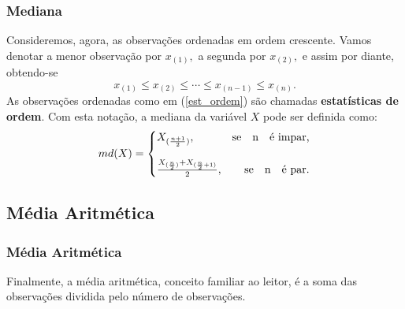 \documentclass[14pt,aspectratio=1610]{beamer}
\begin{document}
\begin{frame}{}
\frametitle{Mediana}
\begin{block}{}
	\small
\justifying
Consideremos, agora, as observações ordenadas em ordem crescente. Vamos denotar a
menor observação por $x_{(1)},$ a segunda por $x_{(2)},$ e assim por diante, obtendo-se
\begin{equation}\label{est_ordem}
x_{(1)}\leq x_{(2)}\leq \cdots \leq x_{(n-1)}\leq x_{(n)}.
\end{equation}
As observações ordenadas como em (\ref{est_ordem}) são chamadas {\bf estatísticas de ordem}. Com esta notação, a mediana da variável $X$ pode ser definida como:
\[
md(X)=\left\{
\setlength\arraycolsep{0pt}
\begin{array}{lr}
X_{(\frac{n+1}{2})},                                             &\quad \textrm{se}\quad $n$\quad \textrm{é impar,}\\
&\\
\frac{X_{(\frac{n}{2})}+X_{(\frac{n}{2}+1)}}{2},  &\quad \textrm{se}\quad $n$\quad \textrm{é par.}\\
\end{array}
\right.
\]
\end{block}
\end{frame}
\subsection{Média Aritmética}
\begin{frame}{}
\frametitle{Média Aritmética}
\begin{block}{}
\justifying
Finalmente, a média aritmética, conceito familiar ao leitor, é a soma das observações dividida pelo número de observações.
\end{block}
\end{frame}

\end{document}
